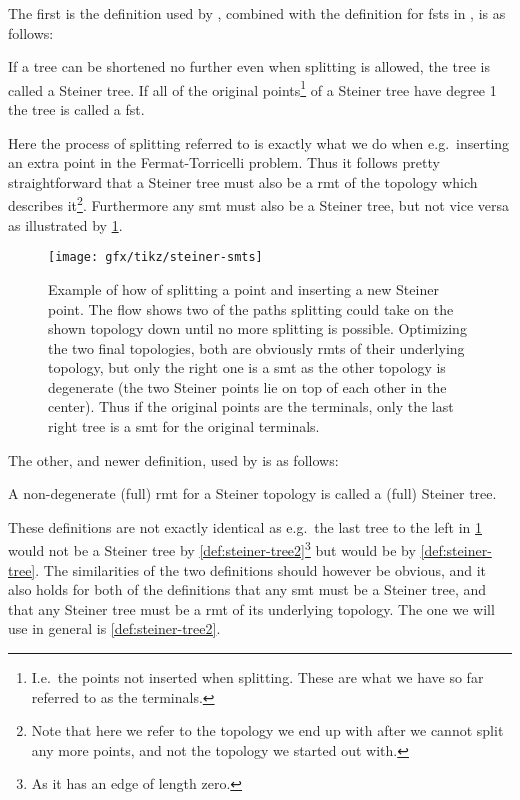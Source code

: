 The first is the definition used by \textcite{gilbert1968}, combined with the
definition for \acp{fst} in \textcite{smith1992}, is as follows:
%
\begin{definition}
  If a tree can be shortened no further even when splitting is allowed, the tree
  is called a Steiner tree. If all of the original points\footnote{I.e.\ the
    points not inserted when splitting. These are what we have so far referred
    to as the terminals.} of a Steiner tree have degree 1 the tree is called a
  \acl{fst}.\label{def:steiner-tree}
\end{definition}
%
Here the process of splitting referred to is exactly what we do when e.g.\
inserting an extra point in the Fermat-Torricelli problem. Thus it follows
pretty straightforward that a Steiner tree must also be a \ac{rmt} of the
topology which describes it\footnote{Note that here we refer to the topology we
  end up with after we cannot split any more points, and not the topology we
  started out with.}. Furthermore any \ac{smt} must also be a Steiner tree, but
not vice versa as illustrated by \cref{fig:steiner-smts}.
%
\begin{figure}[htbp]
\centering
\texttt{[image: gfx/tikz/steiner-smts]}
\caption[Example of splitting and \acsp{rmt}]{Example of how of splitting a point
  and inserting a new Steiner point. The flow shows two of the paths splitting
  could take on the shown topology down until no more splitting is
  possible. Optimizing the two final topologies, both are obviously \acsp{rmt} of
  their underlying topology, but only the right one is a \acs{smt} as the other
  topology is degenerate (the two Steiner points lie on top of each other in the
  center). Thus if the original points are the terminals, only the last right
  tree is a \acs{smt} for the original terminals.\label{fig:steiner-smts}}
\end{figure}
%
The other, and newer definition, used by \textcite{brazil2015} is as follows:
%
\begin{definition}
  A non-degenerate (full) \ac{rmt} for a Steiner topology is called a (full)
  Steiner tree.\label{def:steiner-tree2}
\end{definition}
%
These definitions are not exactly identical as e.g.\ the last tree to the left
in \cref{fig:steiner-smts} would not be a Steiner tree by
\cref{def:steiner-tree2}\footnote{As it has an edge of length zero.}  but would
be by \cref{def:steiner-tree}. The similarities of the two definitions should
however be obvious, and it also holds for both of the definitions that any
\ac{smt} must be a Steiner tree, and that any Steiner tree must be a \ac{rmt} of
its underlying topology. The one we will use in general is
\cref{def:steiner-tree2}.

